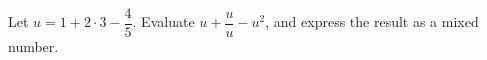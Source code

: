 Let $u=1+2\cdot3-\dfrac{4}{5}$. Evaluate $u+\dfrac{u}{u}-u^2$, and express the result as a mixed number.

